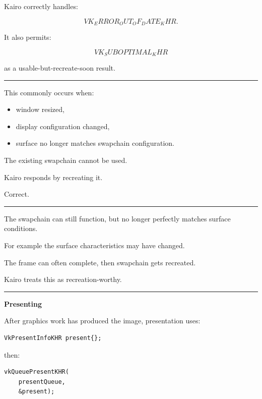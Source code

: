 Kairo correctly handles:

\[
VK_ERROR_OUT_OF_DATE_KHR.
\]

It also permits:

\[
VK_SUBOPTIMAL_KHR
\]

as a usable-but-recreate-soon result.

\begin{center}\rule{0.5\linewidth}{0.5pt}\end{center}

\textbf{}

This commonly occurs when:

\begin{itemize}
\tightlist
\item
  window resized,
\item
  display configuration changed,
\item
  surface no longer matches swapchain configuration.
\end{itemize}

The existing swapchain cannot be used.

Kairo responds by recreating it.

Correct.

\begin{center}\rule{0.5\linewidth}{0.5pt}\end{center}

\textbf{}

The swapchain can still function, but no longer perfectly matches surface conditions.

For example the surface characteristics may have changed.

The frame can often complete, then swapchain gets recreated.

Kairo treats this as recreation-worthy.

\begin{center}\rule{0.5\linewidth}{0.5pt}\end{center}

\textbf{Presenting}

After graphics work has produced the image, presentation uses:

\begin{verbatim}
VkPresentInfoKHR present{};
\end{verbatim}

then:

\begin{verbatim}
vkQueuePresentKHR(
    presentQueue,
    &present);
\end{verbatim}

